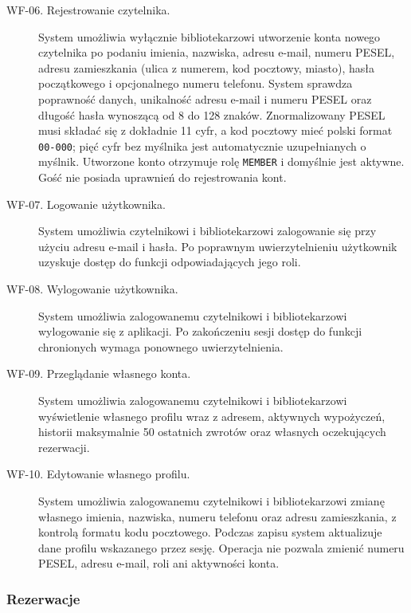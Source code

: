 \documentclass[11pt, a4paper]{article}
\begin{document}
\begin{description}
\item[WF-06. Rejestrowanie czytelnika.] System umożliwia wyłącznie bibliotekarzowi utworzenie konta nowego czytelnika po podaniu imienia, nazwiska, adresu e-mail, numeru PESEL, adresu zamieszkania (ulica z numerem, kod pocztowy, miasto), hasła początkowego i opcjonalnego numeru telefonu. System sprawdza poprawność danych, unikalność adresu e-mail i numeru PESEL oraz długość hasła wynoszącą od 8 do 128 znaków. Znormalizowany PESEL musi składać się z dokładnie 11 cyfr, a kod pocztowy mieć polski format \texttt{00-000}; pięć cyfr bez myślnika jest automatycznie uzupełnianych o myślnik. Utworzone konto otrzymuje rolę \texttt{MEMBER} i domyślnie jest aktywne. Gość nie posiada uprawnień do rejestrowania kont.
\item[WF-07. Logowanie użytkownika.] System umożliwia czytelnikowi i bibliotekarzowi zalogowanie się przy użyciu adresu e-mail i hasła. Po poprawnym uwierzytelnieniu użytkownik uzyskuje dostęp do funkcji odpowiadających jego roli.
\item[WF-08. Wylogowanie użytkownika.] System umożliwia zalogowanemu czytelnikowi i bibliotekarzowi wylogowanie się z aplikacji. Po zakończeniu sesji dostęp do funkcji chronionych wymaga ponownego uwierzytelnienia.
\item[WF-09. Przeglądanie własnego konta.] System umożliwia zalogowanemu czytelnikowi i bibliotekarzowi wyświetlenie własnego profilu wraz z adresem, aktywnych wypożyczeń, historii maksymalnie 50 ostatnich zwrotów oraz własnych oczekujących rezerwacji.
\item[WF-10. Edytowanie własnego profilu.] System umożliwia zalogowanemu czytelnikowi i bibliotekarzowi zmianę własnego imienia, nazwiska, numeru telefonu oraz adresu zamieszkania, z kontrolą formatu kodu pocztowego. Podczas zapisu system aktualizuje dane profilu wskazanego przez sesję. Operacja nie pozwala zmienić numeru PESEL, adresu e-mail, roli ani aktywności konta.
\end{description}

\subsubsection{Rezerwacje}
\end{document}
